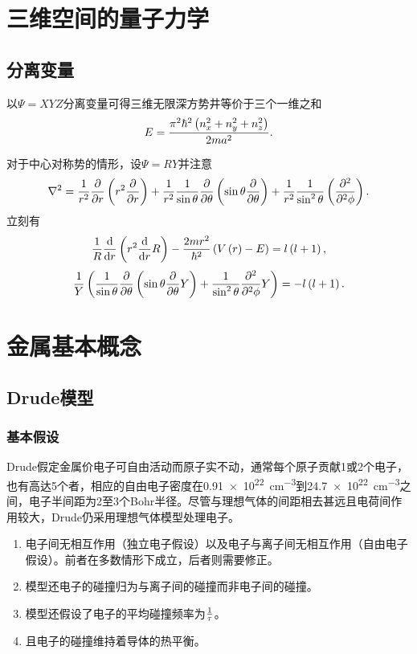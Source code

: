 \documentclass{ctexart}
\begin{document}
\section{三维空间的量子力学}
\subsection{分离变量}
以$\Psi=XYZ$分离变量可得三维无限深方势井等价于三个一维之和
\begin{equation}
\label{eq:3dw}
E = \frac{\pi^2\hbar^2\left(n_x^2+n_y^2+n_z^2\right)}{2ma^2}.
\end{equation}
\par
对于中心对称势的情形，设$\Psi=RY$并注意
\[ \nabla^2 = \frac{1}{r^2}\frac{\partial}{\partial r}\left(r^2\frac{\partial}{\partial r}\right) + \frac{1}{r^2}\frac{1}{\sin\theta}\frac{\partial}{\partial \theta}\left(\sin\theta\frac{\partial}{\partial \theta}\right) + \frac{1}{r^2}\frac{1}{\sin^2\theta}\left(\frac{\partial^2}{\partial^2 \phi}\right). \]
立刻有
\[ \frac{1}{R}\frac{\mathrm{d}}{\mathrm{d} r}\left(r^2\frac{\mathrm{d}}{\mathrm{d} r}{R}\right) - \frac{2mr^2}{\hbar^2}\left(V\left(r\right)-E\right) = l\left(l+1\right), \]
\[ \frac{1}{Y}\left(\frac{1}{\sin\theta}\frac{\partial}{\partial \theta}\left(\sin\theta\frac{\partial}{\partial \theta} Y\right) + \frac{1}{\sin^2\theta}\frac{\partial^2}{\partial^2 \phi} Y\right) = -l\left(l+1\right). \]

\newpage
\section{金属基本概念}
\subsection{Drude模型}
\subsubsection{基本假设}
Drude假定金属价电子可自由活动而原子实不动，通常每个原子贡献1或2个电子，也有高达5个者，相应的自由电子密度在\SI{0.91e22}{\cm^{-3}}到\-\SI{24.7e22}{\cm^{-3}}之间，电子半间距为2至3个Bohr半径。尽管与理想气体的间距相去甚远且电荷间作用较大，Drude仍采用理想气体模型处理电子。
\par
\begin{enumerate}
\item 电子间无相互作用（独立电子假设）以及电子与离子间无相互作用（自由电子假设）。前者在多数情形下成立，后者则需要修正。
\item 模型还电子的碰撞归为与离子间的碰撞而非电子间的碰撞。
\item 模型还假设了电子的平均碰撞频率为$\frac{1}{\tau}$。
\item 且电子的碰撞维持着导体的热平衡。
\end{enumerate}
\end{document}
